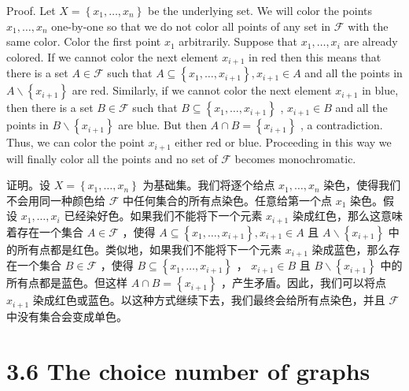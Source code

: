 \documentclass[10pt]{article}
\begin{document}
Proof. Let \(X = \left\{  {{x}_{1},\ldots ,{x}_{n}}\right\}\) be the underlying set. We will color the points \({x}_{1},\ldots ,{x}_{n}\) one-by-one so that we do not color all points of any set in \(\mathcal{F}\) with the same color. Color the first point \({x}_{1}\) arbitrarily. Suppose that \({x}_{1},\ldots ,{x}_{i}\) are already colored. If we cannot color the next element \({x}_{i + 1}\) in red then this means that there is a set \(A \in  \mathcal{F}\) such that \(A \subseteq  \left\{  {{x}_{1},\ldots ,{x}_{i + 1}}\right\}  ,{x}_{i + 1} \in  A\) and all the points in \(A \smallsetminus  \left\{  {x}_{i + 1}\right\}\) are red. Similarly, if we cannot color the next element \({x}_{i + 1}\) in blue, then there is a set \(B \in  \mathcal{F}\) such that \(B \subseteq  \left\{  {{x}_{1},\ldots ,{x}_{i + 1}}\right\}\) , \({x}_{i + 1} \in  B\) and all the points in \(B \smallsetminus  \left\{  {x}_{i + 1}\right\}\) are blue. But then \(A \cap  B = \left\{  {x}_{i + 1}\right\}\) , a contradiction. Thus, we can color the point \({x}_{i + 1}\) either red or blue. Proceeding in this way we will finally color all the points and no set of \(\mathcal{F}\) becomes monochromatic.

\begin{tcolorbox}\relax
证明。设 \(X = \left\{  {{x}_{1},\ldots ,{x}_{n}}\right\}\) 为基础集。我们将逐个给点 \({x}_{1},\ldots ,{x}_{n}\) 染色，使得我们不会用同一种颜色给 \(\mathcal{F}\) 中任何集合的所有点染色。任意给第一个点 \({x}_{1}\) 染色。假设 \({x}_{1},\ldots ,{x}_{i}\) 已经染好色。如果我们不能将下一个元素 \({x}_{i + 1}\) 染成红色，那么这意味着存在一个集合 \(A \in  \mathcal{F}\) ，使得 \(A \subseteq  \left\{  {{x}_{1},\ldots ,{x}_{i + 1}}\right\}  ,{x}_{i + 1} \in  A\) 且 \(A \smallsetminus  \left\{  {x}_{i + 1}\right\}\) 中的所有点都是红色。类似地，如果我们不能将下一个元素 \({x}_{i + 1}\) 染成蓝色，那么存在一个集合 \(B \in  \mathcal{F}\) ，使得 \(B \subseteq  \left\{  {{x}_{1},\ldots ,{x}_{i + 1}}\right\}\) ， \({x}_{i + 1} \in  B\) 且 \(B \smallsetminus  \left\{  {x}_{i + 1}\right\}\) 中的所有点都是蓝色。但这样 \(A \cap  B = \left\{  {x}_{i + 1}\right\}\) ，产生矛盾。因此，我们可以将点 \({x}_{i + 1}\) 染成红色或蓝色。以这种方式继续下去，我们最终会给所有点染色，并且 \(\mathcal{F}\) 中没有集合会变成单色。
\end{tcolorbox}

\section*{3.6 The choice number of graphs}
\end{document}
